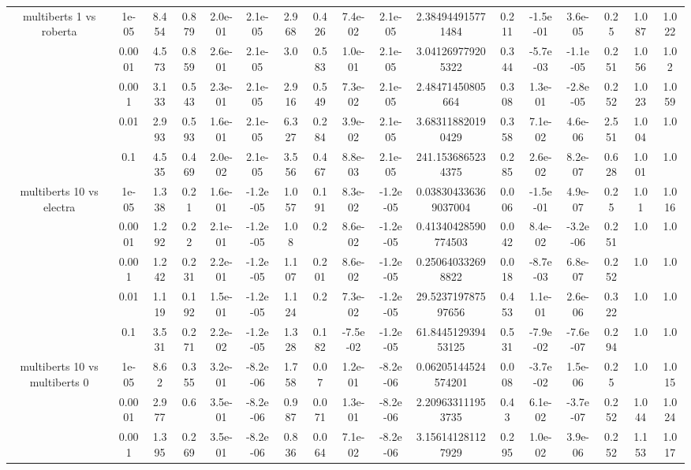 \begin{tabular}{|c|c|c|c|c|c|c|c|c|c|c|c|c|c|c|c|c|}
\hline
\multirow{5}{*}{multiberts 1 vs roberta } & 1e-05 & 8.454 & 0.879 & 2.0e-01 & 2.1e-05 & 2.968 & 0.426 & 7.4e-02 & 2.1e-05 & 2.384944915771484 & 0.211 & -1.5e-01 & 3.6e-05 & 0.25 & 1.087 & 1.022 \\
 & 0.0001 & 4.573 & 0.859 & 2.6e-01 & 2.1e-05 & 3.0 & 0.583 & 1.0e-01 & 2.1e-05 & 3.041269779205322 & 0.344 & -5.7e-03 & -1.1e-05 & 0.251 & 1.056 & 1.02 \\
 & 0.001 & 3.133 & 0.543 & 2.3e-01 & 2.1e-05 & 2.916 & 0.549 & 7.3e-02 & 2.1e-05 & 2.48471450805664 & 0.308 & 1.3e-01 & -2.8e-05 & 0.252 & 1.023 & 1.059 \\
 & 0.01 & 2.993 & 0.593 & 1.6e-01 & 2.1e-05 & 6.327 & 0.284 & 3.9e-02 & 2.1e-05 & 3.683118820190429 & 0.358 & 7.1e-02 & 4.6e-06 & 2.551 & 1.004 & 1.0 \\
 & 0.1 & 4.535 & 0.469 & 2.0e-02 & 2.1e-05 & 3.556 & 0.467 & 8.8e-03 & 2.1e-05 & 241.1536865234375 & 0.285 & 2.6e-02 & 8.2e-07 & 0.628 & 1.001 & 1.0 \\
\hline
\multirow{5}{*}{multiberts 10 vs electra } & 1e-05 & 1.338 & 0.21 & 1.6e-01 & -1.2e-05 & 1.057 & 0.191 & 8.3e-02 & -1.2e-05 & 0.038304336369037004 & 0.006 & -1.5e-01 & 4.9e-07 & 0.25 & 1.01 & 1.016 \\
 & 0.0001 & 1.292 & 0.22 & 2.1e-01 & -1.2e-05 & 1.08 & 0.2 & 8.6e-02 & -1.2e-05 & 0.41340428590774503 & 0.042 & 8.4e-02 & -3.2e-06 & 0.251 & 1.0 & 1.0 \\
 & 0.001 & 1.242 & 0.231 & 2.2e-01 & -1.2e-05 & 1.107 & 0.201 & 8.6e-02 & -1.2e-05 & 0.250640332698822 & 0.018 & -8.7e-03 & 6.8e-07 & 0.252 & 1.0 & 1.0 \\
 & 0.01 & 1.119 & 0.192 & 1.5e-01 & -1.2e-05 & 1.124 & 0.2 & 7.3e-02 & -1.2e-05 & 29.523719787597656 & 0.453 & 1.1e-01 & 2.6e-06 & 0.322 & 1.0 & 1.0 \\
 & 0.1 & 3.531 & 0.271 & 2.2e-02 & -1.2e-05 & 1.328 & 0.182 & -7.5e-02 & -1.2e-05 & 61.844512939453125 & 0.531 & -7.9e-02 & -7.6e-07 & 0.294 & 1.0 & 1.0 \\
\hline
\multirow{5}{*}{multiberts 10 vs multiberts 0} & 1e-05 & 8.62 & 0.355 & 3.2e-01 & -8.2e-06 & 1.758 & 0.07 & 1.2e-01 & -8.2e-06 & 0.06205144524574201 & 0.008 & -3.7e-02 & 1.5e-06 & 0.25 & 1.0 & 1.015 \\
 & 0.0001 & 2.977 & 0.6 & 3.5e-01 & -8.2e-06 & 0.987 & 0.071 & 1.3e-01 & -8.2e-06 & 2.209633111953735 & 0.43 & 6.1e-02 & -3.7e-07 & 0.252 & 1.044 & 1.024 \\
 & 0.001 & 1.395 & 0.269 & 3.5e-01 & -8.2e-06 & 0.836 & 0.064 & 7.1e-02 & -8.2e-06 & 3.156141281127929 & 0.295 & 1.0e-02 & 3.9e-06 & 0.252 & 1.153 & 1.017 \\

\end{tabular}
